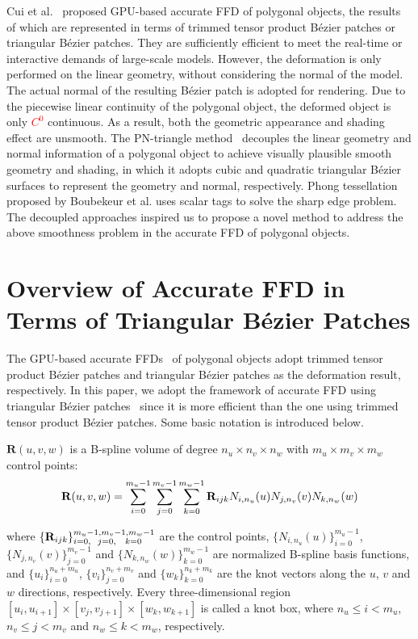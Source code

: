 \documentclass[3p]{elsarticle}
\begin{document}
Cui et al.~\cite{Cui13, Cui14} proposed GPU-based accurate FFD of polygonal objects, the results of which are
represented in terms of trimmed tensor product B\'ezier patches or triangular B\'ezier patches. They are sufficiently
efficient to meet the real-time or interactive demands of large-scale models. However, the deformation is only performed
on the linear geometry, without considering the normal of the model. The actual normal of the resulting B\'ezier patch
is adopted for rendering. Due to the piecewise linear continuity of the polygonal object, the deformed object is only
\textcolor{red}{$C^0$} continuous. As a result, both the geometric appearance and shading effect are unsmooth. The PN-triangle
method~\cite{Vlachos01} decouples the linear geometry and normal information of a polygonal object to achieve visually
plausible smooth geometry and shading, in which it adopts cubic and quadratic triangular B\'ezier surfaces to represent
the geometry and normal, respectively. Phong tessellation \cite{Boubekeur08} proposed by Boubekeur et al. uses scalar
tags to solve the sharp edge problem. The decoupled approaches inspired us to propose a novel method to address the
above smoothness problem in the accurate FFD of polygonal objects.


\section{Overview of Accurate FFD in Terms of Triangular B\'ezier Patches}

The GPU-based accurate FFDs~\cite{Cui13, Cui14} of polygonal objects adopt trimmed tensor product B\'ezier patches and
triangular B\'ezier patches as the deformation result, respectively. In this paper, we adopt the framework of accurate
FFD using triangular B\'ezier patches~\cite{Feng98, Feng00, Cui14} since it is more efficient than the one using trimmed
tensor product B\'ezier patches. Some basic notation is introduced below.

$\mathbf R(u,v,w)$ is a B-spline volume of degree $n_u\times n_v\times n_w$ with $m_u\times m_v\times m_w$ control
points:
\begin{equation}
	\footnotesize
	{\mathbf R}(u,v,w) 
	= \sum_{i=0}^{m_u-1}\sum_{j=0}^{m_v-1}\sum_{k=0}^{m_w-1} {\mathbf
	R}_{ijk}N_{i,n_u}(u)N_{j,n_v}(v)N_{k,n_w}(w)
	\label{equ:Ruvw}
\end{equation}

\noindent where $\{\mathbf R_{ijk}\}_{i=0,\hspace{6 pt} j=0,\hspace{8 pt} k=0}^{m_u-1,m_v-1,m_w-1}$ are the control
points, $\{N_{i,n_u}(u)\}_{i=0}^{m_u-1}$, $\{N_{j,n_v}(v)\}_{j=0}^{m_v-1}$ and $\{N_{k,n_w}(w)\}_{k=0}^{m_w-1}$ are
normalized B-spline basis functions, and $\{u_i\}^{n_u+m_u}_{i=0}$, $\{v_i\}^{n_v+m_v}_{j=0}$ and
$\{w_k\}^{n_k+m_k}_{k=0}$ are the knot vectors along the $u$, $v$ and $w$ directions, respectively. Every
three-dimensional region $[u_i, u_{i+1}] \times [v_j, v_{j+1}] \times [w_k, w_{k+1}]$ is called a knot box, where
$n_u\leq i < m_u$, $n_v\leq j < m_v$ and $n_w\leq k < m_w$, respectively.
\end{document}

